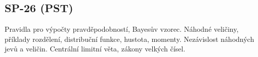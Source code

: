 \subsection{SP-26 (PST)}
Pravidla pro výpočty pravděpodobností, Bayesův vzorec. Náhodné veličiny, příklady rozdělení, distribuční funkce, hustota, momenty. Nezávislost náhodných jevů a veličin. Centrální limitní věta, zákony velkých čísel.